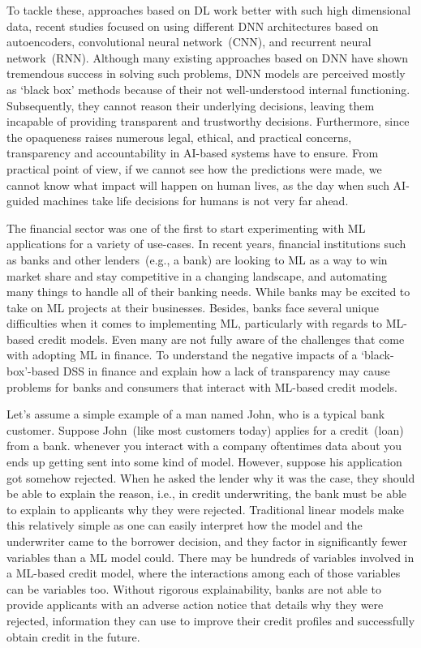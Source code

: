 \hspace*{3.5mm} To tackle these, approaches based on DL work better with such high dimensional data, recent studies focused on using different DNN architectures based on autoencoders, convolutional neural network~(CNN), and recurrent neural network~(RNN). Although many existing approaches based on DNN have shown tremendous success in solving such problems, DNN models are perceived mostly as `black box' methods because of their not well-understood internal functioning. Subsequently, they cannot reason their underlying decisions, leaving them incapable of providing transparent and trustworthy decisions. 
Furthermore, since the opaqueness raises numerous legal, ethical, and practical concerns, transparency and accountability in AI-based systems have to ensure. From practical point of view, if we cannot see how the predictions were made, we cannot know what impact will happen on human lives, as the day when such AI-guided machines take life decisions for humans is not very far ahead. 

\hspace*{3.5mm} The financial sector was one of the first to start experimenting with ML applications for a variety of use-cases. In recent years, financial institutions such as banks and other lenders~(e.g., a bank) are looking to ML as a way to win market share and stay competitive in a changing landscape, and automating many things to handle all of their banking needs. While banks may be excited to take on ML projects at their businesses. Besides, banks face several unique difficulties when it comes to implementing ML, particularly with regards to ML-based credit models. Even many are not fully aware of the challenges that come with adopting ML in finance.
To understand the negative impacts of a `black-box'-based DSS in finance and explain how a lack of transparency may cause problems for banks and consumers that interact with ML-based credit models.

\hspace*{3.5mm} Let's assume a simple example of a man named John, who is a typical bank customer. Suppose John~(like most customers today) applies for a credit~(loan) from a bank. whenever you interact with a company oftentimes data about you ends up getting sent into some kind of model. However, suppose his application got somehow rejected. When he asked the lender why it was the case, they should be able to explain the reason, i.e., in credit underwriting, the bank must be able to explain to applicants why they were rejected. Traditional linear models make this relatively simple as one can easily interpret how the model and the underwriter came to the borrower decision, and they factor in significantly fewer variables than a ML model could. There may be hundreds of variables involved in a ML-based credit model, where the interactions among each of those variables can be variables too. Without rigorous explainability, banks are not able to provide applicants with an adverse action notice that details why they were rejected, information they can use to improve their credit profiles and successfully obtain credit in the future. 

